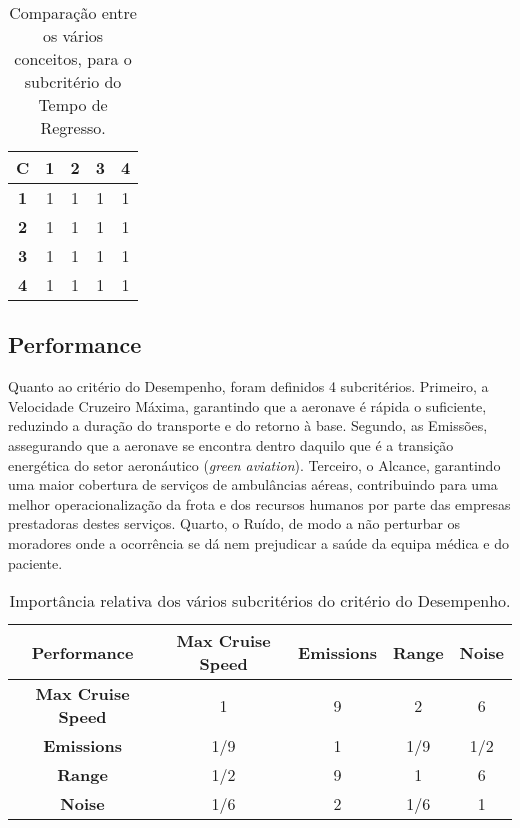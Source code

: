 \begin{table}[H]
\begin{center}
\caption{Comparação entre os vários conceitos, para o subcritério do Tempo de Regresso.}
\begin{tabular}{ |c|c c c c| }
 \hline
 \textbf{C} & \textbf{1} & \textbf{2} & \textbf{3} & \textbf{4}  \\
\hline
 \textbf{1} & 1 & 1 & 1 & 1 \\
 \textbf{2} & 1 & 1 & 1 & 1  \\
 \textbf{3} & 1 & 1 & 1 & 1  \\
 \textbf{4} & 1 & 1 & 1 & 1  \\
\hline
\end{tabular}
\end{center}
\end{table}






\subsection{Performance}

Quanto ao critério do Desempenho, foram definidos 4 subcritérios. Primeiro, a Velocidade Cruzeiro Máxima, garantindo que a aeronave é rápida o suficiente, reduzindo a duração do transporte e do retorno à base. Segundo, as Emissões, assegurando que a aeronave se encontra dentro daquilo que é a transição energética do setor aeronáutico (\textit{green aviation}). Terceiro, o Alcance, garantindo uma maior cobertura de serviços de ambulâncias aéreas, contribuindo para uma melhor operacionalização da frota e dos recursos humanos por parte das empresas prestadoras destes serviços. Quarto, o Ruído, de modo a não perturbar os moradores onde a ocorrência se dá nem prejudicar a saúde da equipa médica e do paciente.





\begin{table}[H]
\begin{center}
\caption{Importância relativa dos vários subcritérios do critério do Desempenho.}
\begin{tabular}{ |c|c c c c| }
 \hline
 \textbf{Performance} & \textbf{Max Cruise Speed} & \textbf{Emissions} & \textbf{Range} & \textbf{Noise}  \\
\hline
 \textbf{Max Cruise Speed} & 1 & 9 & 2 & 6 \\
 \textbf{Emissions} & 1/9 & 1 & 1/9 & 1/2  \\
 \textbf{Range} & 1/2 & 9 & 1 & 6  \\
 \textbf{Noise} & 1/6 & 2 & 1/6 & 1  \\
\hline
\end{tabular}
\end{center}
\end{table}


